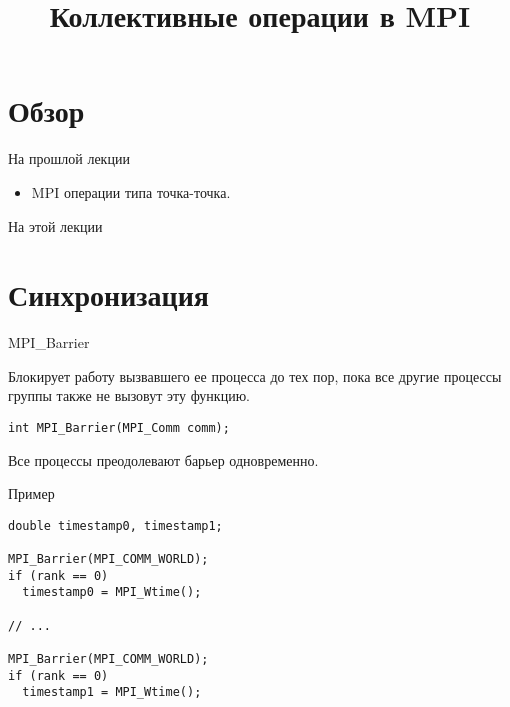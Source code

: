 

\title{Коллективные операции в MPI}



\begin{frame}
\titlepage
\end{frame}

\section*{Обзор}

\begin{frame}{На прошлой лекции}

\begin{itemize}
  \item MPI операции типа точка-точка.
\end{itemize}

\end{frame}

\begin{frame}{На этой лекции}
\tableofcontents
\end{frame} 


\section{Синхронизация}

\begin{frame}[fragile]{MPI_Barrier}

Блокирует работу вызвавшего ее процесса до тех пор, пока все другие процессы группы также не вызовут эту функцию.

\begin{lstlisting}
int MPI_Barrier(MPI_Comm comm);
\end{lstlisting}

Все процессы преодолевают барьер одновременно.

\end{frame}

\begin{frame}[fragile]{Пример}

\begin{lstlisting}
double timestamp0, timestamp1;

MPI_Barrier(MPI_COMM_WORLD);
if (rank == 0)
  timestamp0 = MPI_Wtime();

// ...

MPI_Barrier(MPI_COMM_WORLD);
if (rank == 0)
  timestamp1 = MPI_Wtime();
\end{lstlisting}

\end{frame}

